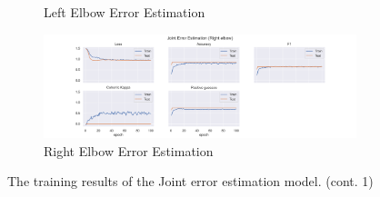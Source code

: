 \begin{figure}
\begin{subfigure}[b]{0.47\linewidth}
      \caption{Left Elbow Error Estimation}
      \label{fig:leel_jt_ee}
  \end{subfigure}
  \hfill
  \begin{subfigure}[b]{0.47\linewidth}
      \centering
      \includegraphics[width=\textwidth]{figures/Results/jt/JointErrorEstimation_Right elbow.png}
      \caption{Right Elbow Error Estimation}
      \label{fig:reel_jt_ee}
  \end{subfigure}
  \caption[]{The training results of the Joint error estimation model. (cont. 1)}
  \label{fig:Joint_training_results_1}
\end{figure}


